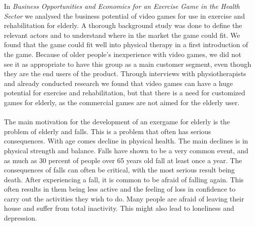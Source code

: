 In \emph{Business Opportunities and Economics for an Exercise Game in the Health Sector} we analysed the business potential of video games for use in exercise and rehabilitation for elderly. A thorough background study was done to define the relevant actors and to understand where in the market the game could fit. We found that the game could fit well into physical therapy in a first introduction of the game. Because of older people's inexperience with video games, we did not see it as appropriate to have this group as a main customer segment, even though they are the end users of the product. Through interviews with physiotherapists and already conducted research we found that video games can have a huge potential  for exercise and rehabilitation, but that there is a need for customized games for elderly, as the commercial games are not aimed for the elderly user. \\ \\
The main motivation for the development of an exergame for elderly is the problem of elderly and falls. This is a problem that often has serious consequences. With age comes decline in physical health. The main declines is in physical strength and balance. Falls have shown to be a very common event, and as much as 30 percent of people over 65 years old fall at least once a year. The consequences of falls can often be critical, with the most serious result being death. After experiencing a fall, it is common to be afraid of falling again. This often results in them being less active and the feeling of loss in confidence to carry out the activities they wish to do. Many people are afraid of leaving their house and suffer from total inactivity. This might also lead to loneliness and depression. \\ \\
